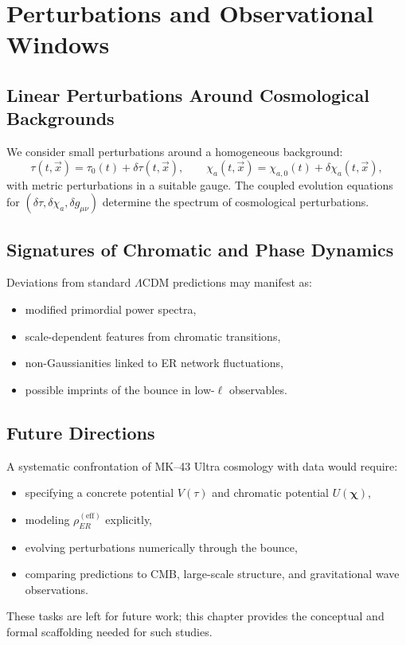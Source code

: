\chapter{Perturbations and Observational Windows}

\section{Linear Perturbations Around Cosmological Backgrounds}

We consider small perturbations around a homogeneous background:
\[
  \tau(t,\vec{x}) = \tau_0(t) + \delta\tau(t,\vec{x}), \qquad
  \chi_a(t,\vec{x}) = \chi_{a,0}(t) + \delta\chi_a(t,\vec{x}),
\]
with metric perturbations in a suitable gauge.
The coupled evolution equations for $(\delta\tau,\delta\chi_a,\delta g_{\mu\nu})$ determine the spectrum of cosmological perturbations.

\section{Signatures of Chromatic and Phase Dynamics}

Deviations from standard $\Lambda$CDM predictions may manifest as:

\begin{itemize}
  \item modified primordial power spectra,
  \item scale-dependent features from chromatic transitions,
  \item non-Gaussianities linked to ER network fluctuations,
  \item possible imprints of the bounce in low-$\ell$ observables.
\end{itemize}

\section{Future Directions}

A systematic confrontation of MK--43 Ultra cosmology with data would require:

\begin{itemize}
  \item specifying a concrete potential $V(\tau)$ and chromatic potential $U(\bm{\chi})$,
  \item modeling $\rho_{ER}^{\mathrm{(eff)}}$ explicitly,
  \item evolving perturbations numerically through the bounce,
  \item comparing predictions to CMB, large-scale structure, and gravitational wave observations.
\end{itemize}
These tasks are left for future work; this chapter provides the conceptual and formal scaffolding needed for such studies.

